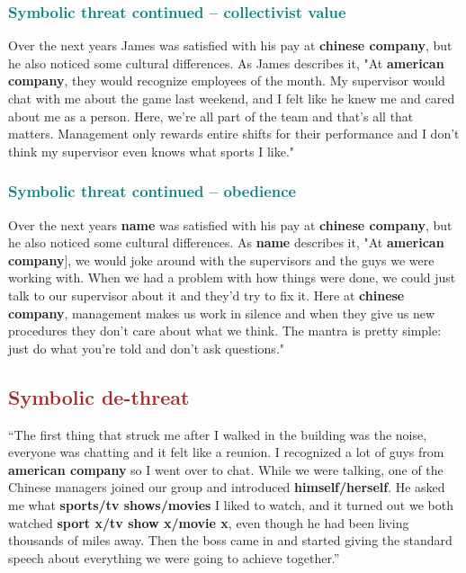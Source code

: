 \documentclass[12pt]{article}
\begin{document}
\subsubsection{\textcolor{teal}{Symbolic threat continued -- collectivist value}}

 Over the next years James was satisfied with his pay at \textbf{chinese company}, but he also noticed some cultural differences. As James describes it, "At \textbf{american company}, they would recognize employees of the month. My supervisor would chat with me about the game last weekend, and I felt like he knew me and cared about me as a person. Here, we're all part of the team and that's all that matters. Management only rewards entire shifts for their performance and I don't think my supervisor even knows what sports I like."
\subsubsection{\textcolor{teal}{Symbolic threat continued -- obedience}}

 Over the next years \textbf{name} was satisfied with his pay at \textbf{chinese company}, but he also noticed some cultural differences. As \textbf{name} describes it, "At \textbf{american company}], we would joke around with the supervisors and the guys we were working with. When we had a problem with how things were done, we could just talk to our supervisor about it and they'd try to fix it. Here at \textbf{chinese company}, management makes us work in silence and when they give us new procedures they don't care about what we think. The mantra is pretty simple: just do what you're told and don't ask questions."

\subsection{\textcolor{brown}{Symbolic de-threat}}

``The first thing that struck me after I walked in the building was the noise, everyone was chatting and it felt like a reunion. I recognized a lot of guys from \textbf{american company} so I went over to chat. While we were talking, one of the Chinese managers joined our group and introduced \textbf{himself/herself}. He asked me what \textbf{sports/tv shows/movies} I liked to watch, and it turned out we both watched \textbf{sport x/tv show x/movie x}, even though he had been living thousands of miles away. Then the boss came in and started giving the standard speech about everything we were going to achieve together.''
\end{document}
